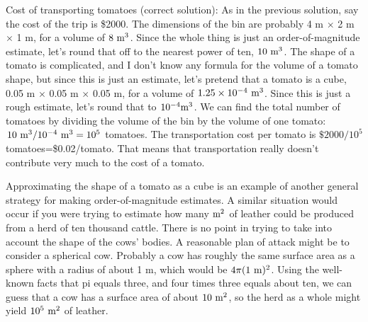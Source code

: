 \vspace{1.5mm}

\begin{exmp}
Cost of transporting tomatoes (correct solution): 
As in the previous solution, say the cost
of the trip is \$2000. The dimensions of the bin are
probably 4 m $\times$ 2 m $\times$ 1 m, for a volume of $8\ \textup{m}^3$.
Since the whole thing is just an order-of-magnitude
estimate, let's round that off to the nearest power of ten,
$10\ \textup{m}^3$. The shape of a tomato is complicated, and I don't
know any formula for the volume of a tomato shape, but since
this is just an estimate, let's pretend that a tomato is a
cube, 0.05 m $\times$ 0.05 m $\times$ 0.05 m, for a volume of $1.25\times10^{-4}\ \munit^3$.
Since this is just a rough estimate, let's round that to
$10^{-4} \textup{m}^3$. We can find the total number of tomatoes by
dividing the volume of the bin by the volume of one tomato:
$10\ \munit^3/10^{-4}\ \munit^3=10^5$ tomatoes. The transportation cost
per tomato is $\$2000/10^5$ tomatoes=\$0.02/tomato. That
means that transportation really doesn't contribute very
much to the cost of a tomato.
\end{exmp}
\divider
\vspace{2mm}

Approximating the shape of a tomato as a cube is an example
of another general strategy for making order-of-magnitude
estimates. A similar situation would occur if you were
trying to estimate how many $\textup{m}^2$ of leather could be
produced from a herd of ten thousand cattle. There is no
point in trying to take into account the shape of the cows'
bodies. A reasonable plan of attack might be to consider a
spherical cow. Probably a cow has roughly the same surface
area as a sphere with a radius of about 1 m, which would
be $4\pi (1\ \textup{m})^2$. Using the well-known facts that pi
equals three, and four times three equals about ten, we can
guess that a cow has a surface area of about $10\ \textup{m}^2$, so
the herd as a whole might yield $10^5\ \textup{m}^2$ of leather.


